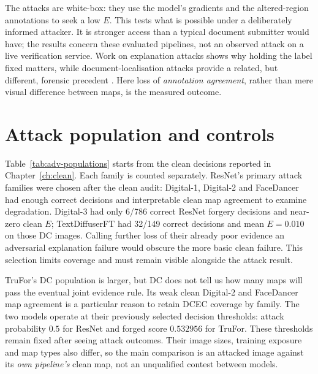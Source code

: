 The attacks are white-box: they use the model's gradients and the altered-region annotations to seek a low $E$. This tests what is possible under a deliberately informed attacker. It is stronger access than a typical document submitter would have; the results concern these evaluated pipelines, not an observed attack on a live verification service. Work on explanation attacks shows why holding the label fixed matters, while document-localisation attacks provide a related, but different, forensic precedent \citep{ghorbani2019fragile,dombrowski2019explanations,shao2025documentrobustness}. Here loss of \emph{annotation agreement}, rather than mere visual difference between maps, is the measured outcome.

\section{Attack population and controls}
\label{sec:adv-population}

Table~\ref{tab:adv-populations} starts from the clean decisions reported in Chapter~\ref{ch:clean}. Each family is counted separately. ResNet's primary attack families were chosen after the clean audit: Digital-1, Digital-2 and FaceDancer had enough correct decisions and interpretable clean map agreement to examine degradation. Digital-3 had only 6/786 correct ResNet forgery decisions and near-zero clean $E$; TextDiffuserFT had 32/149 correct decisions and mean $E=0.010$ on those DC images. Calling further loss of their already poor evidence an adversarial explanation failure would obscure the more basic clean failure. This selection limits coverage and must remain visible alongside the attack result.

TruFor's DC population is larger, but DC does not tell us how many maps will pass the eventual joint evidence rule. Its weak clean Digital-2 and FaceDancer map agreement is a particular reason to retain DCEC coverage by family. The two models operate at their previously selected decision thresholds: attack probability $0.5$ for ResNet and forged score $0.532956$ for TruFor. These thresholds remain fixed after seeing attack outcomes. Their image sizes, training exposure and map types also differ, so the main comparison is an attacked image against its \emph{own pipeline's} clean map, not an unqualified contest between models.

